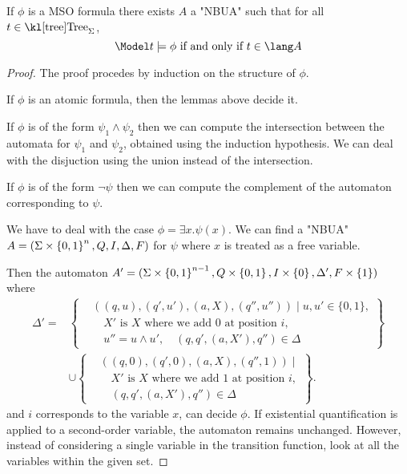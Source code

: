\documentclass{article}
\begin{document}
\begin{lemma} \label{lem:MSO-aut}
	If $\phi$ is a MSO formula there exists $A$ a "NBUA" such that for all $t \in \tree_{\Sigma}$,
	\[ \Model t \models \phi \tiff t \in \lang A \]
\end{lemma}


\begin{proof}
	The proof procedes by induction on the structure of $\phi$.

	If $\phi$ is an atomic formula, then the lemmas above decide it.

	If $\phi$ is of the form $\psi_1 \land \psi_2$ then we can compute the intersection between the automata
	for $\psi_1$ and $\psi_2$, obtained using the induction hypothesis. We can deal with the disjuction using the
	union instead of the intersection.

	If $\phi$ is of the form $\lnot \psi$ then we can compute the complement of the automaton corresponding to $\psi$.

	We have to deal with the case $\phi = \exists x.\psi(x)$. We can find a "NBUA" $A = (\Sigma \times \left\{0,1\right\}^n, Q, I, \Delta, F)$
	for $\psi$ where $x$ is treated as a free variable.

	Then the automaton $A' = (\Sigma \times \left\{0,1\right\}^{n-1}, Q \times \left\{0,1\right\}, I \times \left\{0\right\}, \Delta', F \times \left\{1\right\})$ where
	\[
		\begin{aligned}
			\Delta' = & \left\{
			\begin{aligned}
				 & ((q,u), (q', u'), (a, X), (q'',u'')) \mid u, u' \in \{0,1\},    \\
				 & \quad X' \text{ is $X$ where we add } 0 \text{ at position } i, \\
				 & \quad u'' = u \land u', \quad (q, q', (a, X'), q'') \in \Delta
			\end{aligned}
			\right\}                 \\
			          & \cup \left\{
			\begin{aligned}
				 & ((q,0), (q', 0), (a, X), (q'',1)) \mid                          \\
				 & \quad X' \text{ is $X$ where we add } 1 \text{ at position } i, \\
				 & \quad (q, q', (a, X'), q'') \in \Delta
			\end{aligned}
			\right\}.
		\end{aligned}
	\]
	and $i$ corresponds to the variable $x$, can decide $\phi$. If existential quantification is applied to a
	second-order variable, the automaton remains unchanged. However, instead of considering a single variable
	in the transition function, look at all the variables within the given set.

\end{proof}
\end{document}

